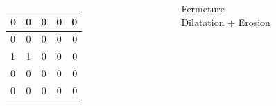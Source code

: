 \documentclass[french]{beamer}
\begin{document}
\begin{frame}
\begin{columns}[T]
\begin{column}{3cm}
\begin{tabular}{|l|c|c|c|r|}
				\hline
			\end{tabular}
			\begin{tabular}{|l|c|c|c|r|}
				\hline
				0 & 0 & 0 & 0 & 0 \\ \hline
				0 & 0 & 0 & 0 & 0 \\ \hline
				1 & 1 & 0 & 0 & 0 \\ \hline
				0 & 0 & 0 & 0 & 0 \\ \hline
				0 & 0 & 0 & 0 & 0 \\
				\hline
			\end{tabular}
		\end{column}
		\begin{column}{3cm}
			Fermeture \\
			\bigskip
			Dilatation + Erosion
		\end{column}
	\end{columns}
\end{frame}
\end{document}
